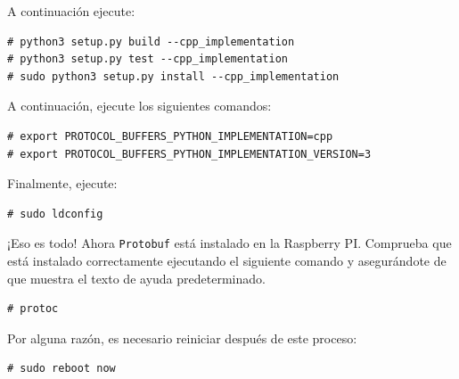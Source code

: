 \vspace{-0.5cm}

\newpage

A continuación ejecute:

\vspace{-0.8cm}

\begin{verbatim}
# python3 setup.py build --cpp_implementation 
# python3 setup.py test --cpp_implementation
# sudo python3 setup.py install --cpp_implementation
\end{verbatim}

\vspace{-0.5cm}

A continuación, ejecute los siguientes comandos:

\vspace{-0.8cm}

\begin{verbatim}
# export PROTOCOL_BUFFERS_PYTHON_IMPLEMENTATION=cpp
# export PROTOCOL_BUFFERS_PYTHON_IMPLEMENTATION_VERSION=3
\end{verbatim}

\vspace{-0.5cm}

Finalmente, ejecute:

\vspace{-0.8cm}

\begin{verbatim}
# sudo ldconfig
\end{verbatim}

\vspace{-0.5cm}

¡Eso es todo! Ahora \texttt{Protobuf} está instalado en la Raspberry PI. Comprueba que está instalado correctamente ejecutando el siguiente comando y asegurándote de que muestra el texto de ayuda predeterminado.

\vspace{-0.8cm}

\begin{verbatim}
# protoc
\end{verbatim}

\vspace{-0.5cm}

Por alguna razón, es necesario reiniciar después de este proceso:

\vspace{-0.8cm}

\begin{verbatim}
# sudo reboot now
\end{verbatim}

